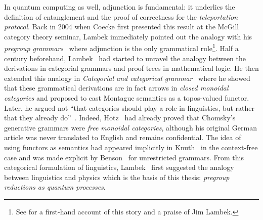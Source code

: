 In quantum computing as well, adjunction is fundamental: it underlies the definition of entanglement and the proof of correctness for the \emph{teleportation protocol}.
Back in 2004 when Coecke first presented this result at the McGill category theory seminar, Lambek immediately pointed out the analogy with his \emph{pregroup grammars}~\cite{Lambek99,Lambek01} where adjunction is the only grammatical rule\footnote
{See \cite{Coecke19} for a first-hand account of this story and a praise of Jim Lambek.}.
Half a century beforehand, Lambek~\cite{Lambek58,Lambek59,Lambek61} had started to unravel the analogy between the derivations in categorial grammars and proof trees in mathematical logic.
He then extended this analogy in \emph{Categorial and categorical grammar}~\cite{Lambek88} where he showed that these grammatical derivations are in fact arrows in \emph{closed monoidal categories} and proposed to cast Montague semantics as a topos-valued functor.
Later, he argued not ``that categories should play a role in linguistics, but rather that they already do''~\cite{Lambek99b}.
Indeed, Hotz~\cite{Hotz66} had already proved that Chomsky's generative grammars were \emph{free monoidal categories}, although his original German article was never translated to English and remains confidential.
The idea of using functors as semantics had appeared implicitly in Knuth~\cite{Knuth68a} in the context-free case and was made explicit by Benson~\cite{Benson70a} for unrestricted grammars.
From this categorical formulation of linguistics, Lambek~\cite{Lambek10} first suggested the analogy between linguistics and physics which is the basis of this thesis: \emph{pregroup reductions as quantum processes}.

